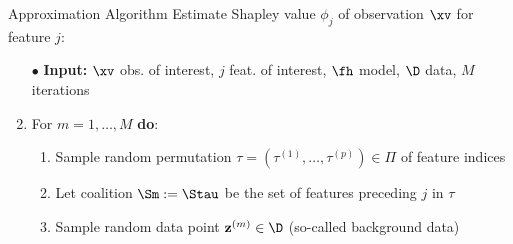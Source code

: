 \documentclass[11pt,compress,t,notes=noshow, aspectratio=169, xcolor=table]{beamer}
\begin{document}
\begin{frame}{Approximation Algorithm }
Estimate Shapley value $\phi_j$ of observation $\xv$ for feature $j$:

  \begin{enumerate}[<+->]
  \item[$\bullet$] \textbf{Input:} $\xv$ obs. of interest, $j$ feat. of interest, $\fh$ model, $\D$ data, $M$ iterations
      \item For $m = 1, \ldots, M$ \textbf{do}:
      \begin{enumerate}
        \item Sample random permutation $\tau = (\tau^{(1)}, \ldots, \tau^{(p)}) \in \Pi$ of feature indices%
        \item Let coalition $\Sm := \Stau$ be the set of features preceding $j$ in $\tau$
        \item Sample random data point {\color{blue} $\mathbf{z}^{(m)} \in \D$} (so-called background data)%

\end{enumerate}
\end{enumerate}
\end{frame}
\end{document}
